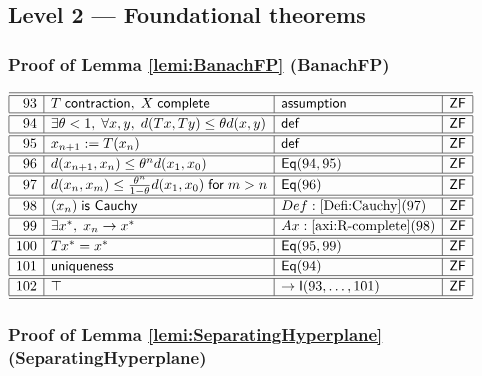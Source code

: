 \documentclass[11pt,reqno]{amsart}
\begin{document}
\medskip

\subsection*{\textsf{Level 2 --- Foundational theorems}}

\subsubsection*{Proof of Lemma \ref{lemi:BanachFP} (\textsf{BanachFP})}

\noindent$%
\begin{array}{|r|l|l|l|}
\hline\hline
93 & T\;\mathsf{contraction},\;X\;\mathsf{complete} & \mathsf{assumption} & \mathsf{ZF} \\ \hline\hline
94 & \exists\theta<1,\;\forall x,y,\;d(Tx,Ty)\le\theta d(x,y) & \mathsf{def} & \mathsf{ZF} \\ \hline\hline
95 & x_{n+1}:=T(x_{n}) & \mathsf{def} & \mathsf{ZF} \\ \hline\hline
96 & d(x_{n+1},x_{n})\le\theta^{n}d(x_{1},x_{0}) & \mathsf{Eq}(94,95) & \mathsf{ZF} \\ \hline\hline
97 & d(x_{n},x_{m})\le\frac{\theta^{n}}{1-\theta}d(x_{1},x_{0})\;\mathsf{for}\;m>n & \mathsf{Eq}(96) & \mathsf{ZF} \\ \hline\hline
98 & (x_{n})\;\mathsf{is\ Cauchy} & Def:\ref{Defi:Cauchy}(97) & \mathsf{ZF} \\ \hline\hline
99 & \exists x^{*},\;x_{n}\to x^{*} & Ax:\ref{axi:R-complete}(98) & \mathsf{ZF} \\ \hline\hline
100 & Tx^{*}=x^{*} & \mathsf{Eq}(95,99) & \mathsf{ZF} \\ \hline\hline
101 & \mathsf{uniqueness} & \mathsf{Eq}(94) & \mathsf{ZF} \\ \hline\hline
102 & \top & \to\mathsf{I}(93,\dots,101) & \mathsf{ZF} \\ \hline\hline
\end{array}%
$

\medskip

\subsubsection*{Proof of Lemma \ref{lemi:SeparatingHyperplane} (\textsf{SeparatingHyperplane})}
\end{document}
